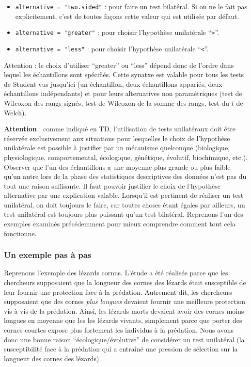 \documentclass[
  a4paper,
]{article}
\providecommand{\tightlist}{%
  \setlength{\itemsep}{0pt}\setlength{\parskip}{0pt}}
\begin{document}
\begin{itemize}
\tightlist
\item
  \texttt{alternative\ =\ "two.sided"} : pour faire un test bilatéral. Si on ne le fait pas explicitement, c'est de toutes façons cette valeur qui est utilisée par défaut.
\item
  \texttt{alternative\ =\ "greater"} : pour choisir l'hypothèse unilatérale ``\texttt{\textgreater{}}''.
\item
  \texttt{alternative\ =\ "less"} : pour choisir l'hypothèse unilatérale ``\texttt{\textless{}}''.
\end{itemize}

Attention : le choix d'utiliser ``greater'' ou ``less'' dépend donc de l'ordre dans lequel les échantillons sont spécifiés. Cette synatxe est valable pour tous les tests de Student vus jusqu'ici (un échantillon, deux échantillons appariés, deux échantillons indépendants) et pour leurs alternatives non paramétriques (test de Wilcoxon des rangs signés, test de Wilcoxon de la somme des rangs, test du \(t\) de Welch).

\textbf{Attention} : comme indiqué en TD, l'utilisation de tests unilatéraux doit être réservée exclusivement aux situations pour lesquelles le choix de l'hypothèse unilatérale est possible à justifier par un mécanisme quelconque (biologique, physiologique, comportemental, écologique, génétique, évolutif, biochimique, etc.). Observer que l'un des échantillons a une moyenne plus grande ou plus faible qu'un autre lors de la phase des statistiques descriptives des données n'est pas du tout une raison suffisante. Il faut pouvoir justifier le choix de l'hypothèse alternative par une explication valable. Lorsqu'il est pertinent de réaliser un test unilatéral, on doit toujours le faire, car toutes choses étant égales par ailleurs, un test unilatéral est toujours plus puissant qu'un test bilatéral.
Reprenons l'un des exemples examinés précédemment pour mieux comprendre comment tout cela fonctionne.

\hypertarget{un-exemple-pas-uxe0-pas}{%
\subsubsection{Un exemple pas à pas}\label{un-exemple-pas-uxe0-pas}}

Reprenons l'exemple des lézards cornus. L'étude a été réalisée parce que les chercheurs supposaient que la longueur des cornes des lézards était susceptible de leur fournir une protection face à la prédation. Autrement dit, les chercheurs supposaient que des cornes \emph{plus longues} devaient fournir une meilleure protection vis à vis de la prédation. Ainsi, les lézards morts devaient avoir des cornes moins longues en moyenne que les les lézards vivants, simplement parce que porter des cornes courtes expose plus fortement les individus à la prédation. Nous avons donc une bonne raison ``écologique/évolutive'' de considérer un test unilatéral (la susceptibilité face à la prédation qui a entraîné une pression de sélection sur la longueur des cornes des lézards).
\end{document}
